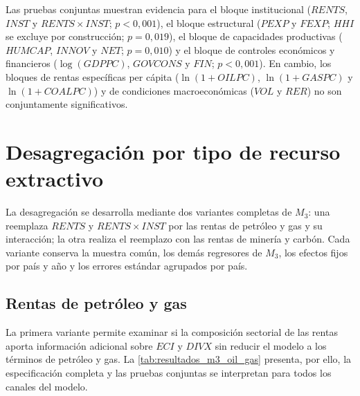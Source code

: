 \documentclass[../../TFM.tex]{subfiles}
\begin{document}
Las pruebas conjuntas muestran evidencia para el bloque institucional
($RENTS$, $INST$ y $RENTS\times INST$; $p<0,001$), el bloque estructural
($PEXP$ y $FEXP$; $HHI$ se excluye por construcción; $p=0,019$), el bloque de
capacidades productivas ($HUMCAP$, $INNOV$ y $NET$; $p=0,010$) y el bloque de
controles económicos y financieros ($\log(GDPPC)$, $GOVCONS$ y $FIN$;
$p<0,001$). En cambio, los bloques de rentas específicas per cápita
($\ln(1+OILPC)$, $\ln(1+GASPC)$ y $\ln(1+COALPC)$) y de condiciones
macroeconómicas ($VOL$ y $RER$) no son conjuntamente significativos.


\section{Desagregación por tipo de recurso extractivo}
\label{sec:resultados-desagregacion}

La desagregación se desarrolla mediante dos variantes completas de $M_3$: una
reemplaza $RENTS$ y $RENTS\times INST$ por las rentas de petróleo y gas y su
interacción; la otra realiza el reemplazo con las rentas de minería y carbón.
Cada variante conserva la muestra común, los demás regresores de $M_3$, los
efectos fijos por país y año y los errores estándar agrupados por país.

\subsection{Rentas de petróleo y gas}
\label{subsec:resultados-rents-oil-gas}

La primera variante permite examinar si la composición sectorial de las rentas
aporta información adicional sobre $ECI$ y $DIVX$ sin reducir el modelo a los
términos de petróleo y gas. La \autoref{tab:resultados_m3_oil_gas} presenta, por
ello, la especificación completa y las pruebas conjuntas se interpretan para
todos los canales del modelo.
\end{document}
